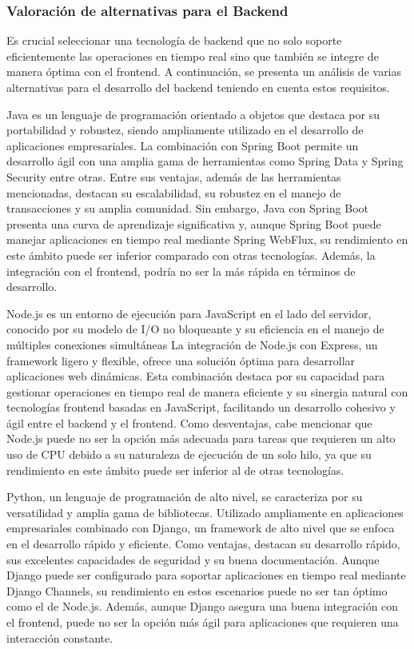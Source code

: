 \subsubsection{Valoración de alternativas para el Backend}
Es crucial seleccionar una tecnología de backend que no solo soporte eficientemente las operaciones en tiempo real sino que también se integre de manera óptima con el frontend.
A continuación, se presenta un análisis de varias alternativas para el desarrollo del backend teniendo en cuenta estos requisitos.

Java es un lenguaje de programación orientado a objetos que destaca por su portabilidad y robustez, siendo ampliamente utilizado en el desarrollo de aplicaciones empresariales. 
La combinación con Spring Boot permite un desarrollo ágil con una amplia gama de herramientas como Spring Data y Spring Security entre otras. 
Entre sus ventajas, además de las herramientas mencionadas, destacan su escalabilidad, su robustez en el manejo de transacciones y su amplia comunidad. 
Sin embargo, Java con Spring Boot presenta una curva de aprendizaje significativa y, aunque Spring Boot puede manejar aplicaciones en tiempo real mediante Spring WebFlux, su rendimiento en este ámbito puede ser inferior comparado con otras tecnologías. Además, la integración con el frontend, podría no ser la más rápida en términos de desarrollo.

Node.js es un entorno de ejecución para JavaScript en el lado del servidor, conocido por su modelo de I/O no bloqueante y su eficiencia en el manejo de múltiples conexiones simultáneas
La integración de Node.js con Express, un framework ligero y flexible, ofrece una solución óptima para desarrollar aplicaciones web dinámicas.
Esta combinación destaca por su capacidad para gestionar operaciones en tiempo real de manera eficiente y su sinergia natural con tecnologías frontend basadas en JavaScript, facilitando un desarrollo cohesivo y ágil entre el backend y el frontend.
Como desventajas, cabe mencionar que Node.js puede no ser la opción más adecuada para tareas que requieren un alto uso de CPU debido a su naturaleza de ejecución de un solo hilo, ya que su rendimiento en este ámbito puede ser inferior al de otras tecnologías.

Python, un lenguaje de programación de alto nivel, se caracteriza por su versatilidad y amplia gama de bibliotecas. Utilizado ampliamente en aplicaciones empresariales combinado con Django, un framework de alto nivel que se enfoca en el desarrollo rápido y eficiente.
Como ventajas, destacan su desarrollo rápido, sus excelentes capacidades de seguridad y su buena documentación.
Aunque Django puede ser configurado para soportar aplicaciones en tiempo real mediante Django Channels, su rendimiento en estos escenarios puede no ser tan óptimo como el de Node.js. Además, aunque Django asegura una buena integración con el frontend, puede no ser la opción más ágil para aplicaciones que requieren una interacción constante.



